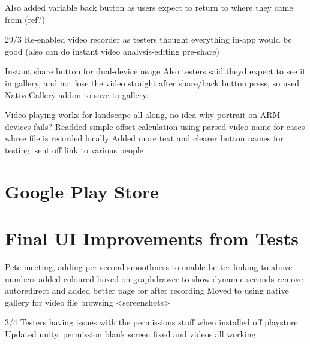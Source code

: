 Also added variable back button as users expect to return to where they came from (ref?)



29/3
Re-enabled video recorder as testers thought everything in-app would be good (also can do instant video analysis-editing pre-share)

Instant share button for dual-device usage
Also testers said theyd expect to see it in gallery, and not lose the video straight after share/back button press, so used NativeGallery addon to save to gallery.

 Video playing works for landscape all along, no idea why portrait on ARM devices fails?
Readded simple offset calculation using parsed video name for cases whree file is recorded locally
Added more text and clearer button names for testing, sent off link to various people




\section{Google Play Store}




\section{Final UI Improvements from Tests}
Pete meeting, adding per-second smoothness to enable better linking to above numbers
added coloured boxed on graphdrawer to show dynamic seconds
remove autoredirect and added better page for after recording
Moved to using native gallery for video file browsing
<screenshots>


3/4
Testers having issues with the permissions stuff when installed off playstore
Updated unity, permission blank screen fixed and videos all working









































